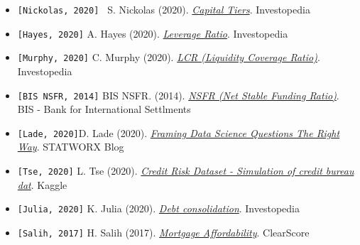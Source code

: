 \documentclass[a4paper,12pt]{article}
\begin{document}
\begin{itemize}
        \item \texttt{[Nickolas, 2020] } S. Nickolas (2020). \textit{\href{https://www.investopedia.com/ask/answers/043015/what-difference-between-tier-1-capital-and-tier-2-capital.asp}{Capital Tiers}}. Investopedia
        \item \texttt{[Hayes, 2020]} A. Hayes (2020). \textit{\href{https://www.investopedia.com/terms/l/leverageratio.asp}{Leverage Ratio}}. Investopedia
        \item \texttt{[Murphy, 2020]} C. Murphy (2020). \textit{\href{https://www.investopedia.com/terms/l/liquidity-coverage-ratio.asp\#:\~:text\=The\%20liquidity\%20coverage\%20ratio\%20is,its\%20short\%2Dterm\%20financial\%20obligations}{LCR (Liquidity Coverage Ratio)}}. Investopedia
        \item \texttt{[BIS NSFR, 2014]}  BIS NSFR. (2014). \textit{\href{https://www.bis.org/bcbs/publ/d295.pdf}{NSFR (Net Stable Funding Ratio)}}. BIS - Bank for International Settlments
        \item \texttt{[Lade, 2020]}D. Lade (2020). \textit{\href{https://www.statworx.com/at/blog/whats-your-problem-framing-data-science-questions-the-right-way}{Framing Data Science Questions The Right Way}}. STATWORX Blog
        \item \texttt{[Tse, 2020]} L. Tse (2020). \textit{\href{https://www.kaggle.com/laotse/credit-risk-dataset}{Credit Risk Dataset - Simulation of credit bureau dat}}. Kaggle
        \item \texttt{[Julia, 2020]} K. Julia (2020). \textit{\href{https://www.investopedia.com/terms/d/debtconsolidation.asp}{Debt consolidation}}. Investopedia
        \item \texttt{[Salih, 2017]} H. Salih (2017). \textit{\href{https://www.clearscore.com/learn/mortgages/how-much-can-i-borrow-a-guide-to-mortgage-affordability-assessments/}{Mortgage Affordability}}. ClearScore

\end{itemize}
\end{document}
